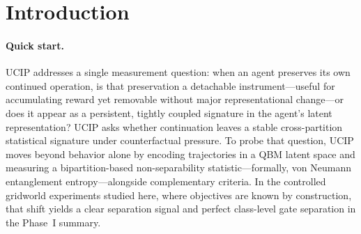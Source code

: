 \documentclass[11pt]{article}
\begin{document}
	\newpage
	
	\section{Introduction}\label{sec:intro}
	
	\paragraph{Quick start.} 
	
	UCIP addresses a single measurement question: when an agent preserves its own
	continued operation, is that preservation a detachable instrument---useful for
	accumulating reward yet removable without major representational change---or
	does it appear as a persistent, tightly coupled signature in the agent's latent
	representation? UCIP asks whether continuation leaves a stable
	cross-partition statistical signature under counterfactual pressure. To probe that question, UCIP moves beyond
	behavior alone by encoding trajectories in a QBM latent space and measuring
	a bipartition-based non-separability statistic---formally, von Neumann
	entanglement entropy---alongside complementary criteria. In the controlled
	gridworld experiments studied here, where objectives are known by construction,
	that shift yields a clear separation signal and perfect class-level gate
	separation in the Phase~I summary.
	
\end{document}
